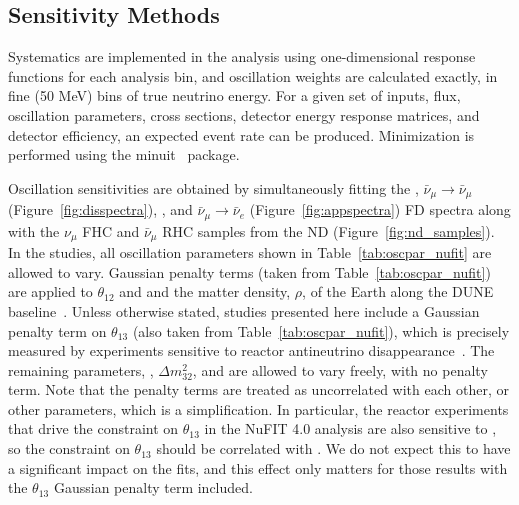 \subsection{Sensitivity Methods}
Systematics are implemented in the analysis using one-dimensional response functions for each analysis bin, and oscillation weights are calculated exactly, in fine (50 MeV) bins of true neutrino energy. For a given set of inputs, flux, oscillation parameters, cross sections, detector energy response matrices, and detector efficiency, an expected event rate can be produced. Minimization is performed using the {\sc minuit}~\cite{James:1994vla} package.

Oscillation sensitivities are obtained by simultaneously fitting the \numutonumu, $\bar{\nu}_\mu \rightarrow \bar{\nu}_\mu$ (Figure~\ref{fig:disspectra}), \numutonue, and $\bar{\nu}_\mu \rightarrow \bar{\nu}_e$ (Figure~\ref{fig:appspectra}) FD spectra along with the $\nu_{\mu}$ FHC and $\bar{\nu}_{\mu}$ RHC samples from the ND (Figure~\ref{fig:nd_samples}). In the studies, all oscillation parameters shown in Table~\ref{tab:oscpar_nufit} are allowed to vary. Gaussian penalty terms (taken from Table~\ref{tab:oscpar_nufit}) are applied to $\theta_{12}$ and  and the matter density, $\rho$, of the Earth along the DUNE baseline~\cite{Roe:2017zdw}. Unless otherwise stated, studies presented here include a Gaussian penalty term on $\theta_{13}$ (also taken from Table~\ref{tab:oscpar_nufit}), which is precisely measured by experiments sensitive to reactor antineutrino disappearance~\cite{Abe:2014bwa,Adey:2018zwh,Bak:2018ydk}. The remaining parameters, , $\Delta m^{2}_{32}$, and \deltacp are allowed to vary freely, with no penalty term. Note that the penalty terms are treated as uncorrelated with each other, or other parameters, which is a simplification. In particular, the reactor experiments that drive the constraint on $\theta_{13}$ in the NuFIT 4.0 analysis are also sensitive to , so the constraint on $\theta_{13}$ should be correlated with . We do not expect this to have a significant impact on the fits, and this effect only matters for those results with the $\theta_{13}$ Gaussian penalty term included.


